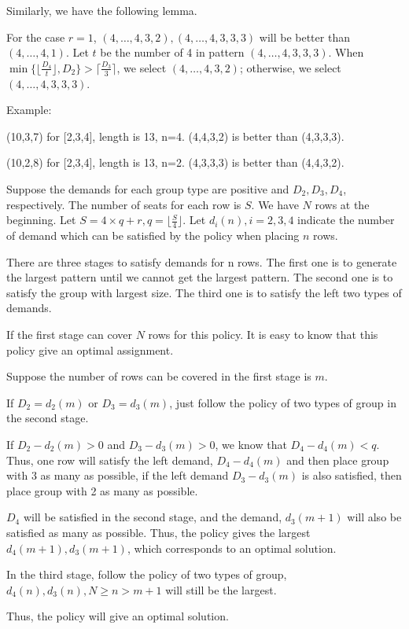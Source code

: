 Similarly, we have the following lemma.

\begin{lem}
For the case $r=1$, $(4,\ldots,4,3,2),(4,\ldots,4,3,3,3)$ will be better than $(4,\ldots,4,1)$. Let $t$ be the number of 4 in pattern $(4,\ldots,4,3,3,3)$.
When $\min\{\lfloor \frac{D_4}{t} \rfloor, D_2\} > \lceil \frac{D_3}{3} \rceil$, we select $(4,\ldots,4,3,2)$; otherwise, we select $(4,\ldots,4,3,3,3)$.
\end{lem}

Example:

(10,3,7) for [2,3,4], length is 13, n=4. (4,4,3,2) is better than (4,3,3,3).

(10,2,8) for [2,3,4], length is 13, n=2. (4,3,3,3) is better than (4,4,3,2).

\begin{pf}
Suppose the demands for each group type are positive and $D_2,D_3,D_4$, respectively. The number of seats for each row is $S$. We have $N$ rows at the beginning. Let $S = 4 \times q +r, q = \lfloor \frac{S}{4} \rfloor$. Let $d_i(n), i =2,3,4$ indicate the number of demand which can be satisfied by the policy when placing $n$ rows.

There are three stages to satisfy demands for n rows. The first one is to generate the largest pattern until we cannot get the largest pattern. The second one is to satisfy the group with largest size. The third one is to satisfy the left two types of demands.

If the first stage can cover $N$ rows for this policy. It is easy to know that this policy give an optimal assignment.

Suppose the number of rows can be covered in the first stage is $m$.

If $D_2 = d_2(m)$ or $D_3 = d_3(m)$, just follow the policy of two types of group in the second stage.

If $D_2 - d_2(m)>0$ and $D_3 - d_3(m)>0$, we know that $D_4 - d_4(m) < q$. Thus, one row will satisfy the left demand, $D_4 - d_4(m)$ and then place group with 3 as many as possible, if the left demand $D_3 - d_3(m)$ is also satisfied, then place group with 2 as many as possible.

$D_4$ will be satisfied in the second stage, and the demand, $d_3(m+1)$ will also be satisfied as many as possible. Thus, the policy gives the largest $d_4(m+1), d_3(m+1)$, which corresponds to an optimal solution.

In the third stage, follow the policy of two types of group, $d_4(n),d_3(n),N \geq n>m+1$ will still be the largest.

Thus, the policy will give an optimal solution.

\end{pf}


